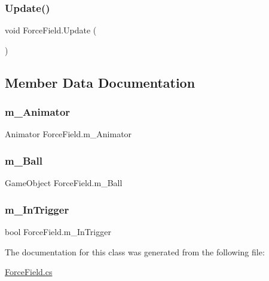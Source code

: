 \subsubsection{\texorpdfstring{Update()}{Update()}}
{\footnotesize\ttfamily void Force\+Field.\+Update (\begin{DoxyParamCaption}{ }\end{DoxyParamCaption})\hspace{0.3cm}{\ttfamily [private]}}



\subsection{Member Data Documentation}
\mbox{\label{class_force_field_a48087ec1814d9b3b0c64d568c50704a8}} 
\subsubsection{\texorpdfstring{m\+\_\+\+Animator}{m\_Animator}}
{\footnotesize\ttfamily Animator Force\+Field.\+m\+\_\+\+Animator\hspace{0.3cm}{\ttfamily [private]}}

\mbox{\label{class_force_field_a3fe0e589031437d56a08af4f313b9193}} 
\subsubsection{\texorpdfstring{m\+\_\+\+Ball}{m\_Ball}}
{\footnotesize\ttfamily Game\+Object Force\+Field.\+m\+\_\+\+Ball\hspace{0.3cm}{\ttfamily [private]}}

\mbox{\label{class_force_field_add42e1b3ae6deec80beca3a10831bf71}} 
\subsubsection{\texorpdfstring{m\+\_\+\+In\+Trigger}{m\_InTrigger}}
{\footnotesize\ttfamily bool Force\+Field.\+m\+\_\+\+In\+Trigger\hspace{0.3cm}{\ttfamily [private]}}



The documentation for this class was generated from the following file\+:\begin{DoxyCompactItemize}
\item 
\mbox{\hyperlink{_force_field_8cs}{Force\+Field.\+cs}}\end{DoxyCompactItemize}
